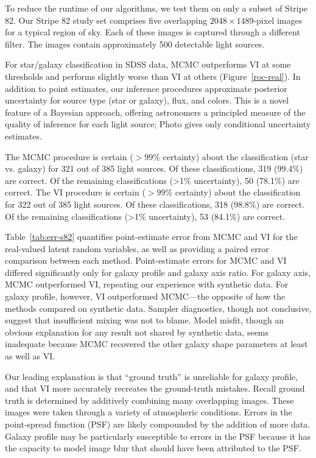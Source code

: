 To reduce the runtime of our algorithms, we test them on only a subset of Stripe 82.
Our Stripe 82 study set comprises five overlapping $2048 \times 1489$-pixel images for a typical region of sky.
Each of these images is captured through a different filter.
The images contain approximately 500 detectable light sources.

For star/galaxy classification in SDSS data, MCMC outperforms VI at some thresholds and performs slightly worse than VI at others (Figure~\ref{roc-real}). In addition to point estimates, our inference procedures approximate posterior uncertainty for source type (star or galaxy), flux, and colors. This is a novel feature of a Bayesian approach, offering astronomers a principled measure of the quality of inference for each light source; Photo gives only conditional uncertainty estimates.

The MCMC procedure is certain ($> 99\%$ certainty) about the classification (star vs. galaxy) for 321 out of 385 light sources.
Of these classifications, 319 (99.4\%) are correct. Of the remaining classifications (>1\% uncertainty), 50 (78.1\%) are correct.
The VI procedure is certain ($> 99\%$ certainty) about the classification for 322 out of 385 light sources.
Of these classifications, 318 (98.8\%) are correct. Of the remaining classifications (>1\% uncertainty), 53 (84.1\%) are correct.

Table~\ref{tab:err-s82} quantifies point-estimate error from MCMC and VI for the real-valued latent random variables, as well as providing a paired error comparison between each method.
Point-estimate errors for MCMC and VI differed significantly only for galaxy profile and galaxy axis ratio.
For galaxy axis, MCMC outperformed VI, repeating our experience with synthetic data.
For galaxy profile, however, VI outperformed MCMC---the opposite of how the methods compared on synthetic data.
Sampler diagnostics, though not conclusive, suggest that insufficient mixing was not to blame.
Model misfit, though an obvious explanation for any result not shared by synthetic data, seems inadequate because MCMC recovered the other galaxy shape parameters at least as well as VI.

Our leading explanation is that ``ground truth'' is unreliable for galaxy profile, and that VI more accurately recreates the ground-truth mistakes.
Recall ground truth is determined by additively combining many overlapping images.
These images were taken through a variety of atmospheric conditions.
Errors in the point-spread function (PSF) are likely compounded by the addition of more data.
Galaxy profile may be particularly susceptible to errors in the PSF because it has the capacity to model image blur that should have been attributed to the PSF.

